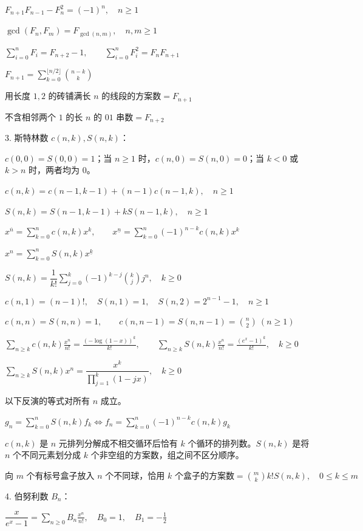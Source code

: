 $F_{n+1}F_{n-1}-F_n^2=(-1)^n,\quad n\ge1$

$\gcd(F_n,F_m)=F_{\gcd(n,m)},\quad n,m\ge1$

$\displaystyle\sum_{i=0}^{n}F_i=F_{n+2}-1,\qquad\sum_{i=0}^{n}F_i^2=F_nF_{n+1}$

$F_{n+1}=\displaystyle\sum_{k=0}^{\lfloor n/2\rfloor}\binom{n-k}k$

$\text{用长度 $1,2$ 的砖铺满长 $n$ 的线段的方案数}=F_{n+1}$

$\text{不含相邻两个 $1$ 的长 $n$ 的 $01$ 串数}=F_{n+2}$

3. 斯特林数 $c(n,k),S(n,k)$：\nopagebreak[4]

$c(0,0)=S(0,0)=1$；当 $n\ge1$ 时，$c(n,0)=S(n,0)=0$；当 $k<0$ 或 $k>n$ 时，两者均为 $0$。

$c(n,k)=c(n-1,k-1)+(n-1)c(n-1,k),\quad n\ge1$

$S(n,k)=S(n-1,k-1)+kS(n-1,k),\quad n\ge1$

$x^{\overline n}=\displaystyle\sum_{k=0}^{n}c(n,k)x^k,\qquad x^{\underline n}=\sum_{k=0}^{n}(-1)^{n-k}c(n,k)x^k$

$x^n=\displaystyle\sum_{k=0}^{n}S(n,k)x^{\underline k}$

$S(n,k)=\dfrac1{k!}\displaystyle\sum_{j=0}^{k}(-1)^{k-j}\binom kj j^n,\quad k\ge0$

$c(n,1)=(n-1)!,\quad S(n,1)=1,\quad S(n,2)=2^{n-1}-1,\quad n\ge1$

$c(n,n)=S(n,n)=1,\qquad c(n,n-1)=S(n,n-1)=\binom n2\ (n\ge1)$

$\displaystyle\sum_{n\ge k}c(n,k)\frac{x^n}{n!}=\frac{(-\log(1-x))^k}{k!},\qquad\sum_{n\ge k}S(n,k)\frac{x^n}{n!}=\frac{(e^x-1)^k}{k!},\quad k\ge0$

$\displaystyle\sum_{n\ge k}S(n,k)x^n=\dfrac{x^k}{\prod_{j=1}^{k}(1-jx)},\quad k\ge0$

以下反演的等式对所有 $n$ 成立。\nopagebreak[4]

$g_n=\displaystyle\sum_{k=0}^{n}S(n,k)f_k\iff f_n=\sum_{k=0}^{n}(-1)^{n-k}c(n,k)g_k$

$c(n,k)$ 是 $n$ 元排列分解成不相交循环后恰有 $k$ 个循环的排列数。$S(n,k)$ 是将 $n$ 个不同元素划分成 $k$ 个非空组的方案数，组之间不区分顺序。

$\text{向 $m$ 个有标号盒子放入 $n$ 个不同球，恰用 $k$ 个盒子的方案数}=\binom mk k!S(n,k),\quad0\le k\le m$

4. 伯努利数 $B_n$：\nopagebreak[4]

$\dfrac{x}{e^x-1}=\displaystyle\sum_{n\ge0}B_n\frac{x^n}{n!},\quad B_0=1,\quad B_1=-\frac12$


